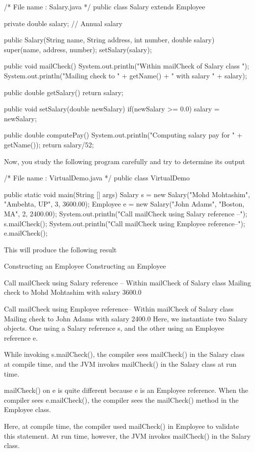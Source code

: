 /* File name : Salary.java */
public class Salary extends Employee {
   private double salary; // Annual salary

   public Salary(String name, String address, int number, double salary) {
      super(name, address, number);
      setSalary(salary);
   }

   public void mailCheck() {
      System.out.println("Within mailCheck of Salary class ");
      System.out.println("Mailing check to " + getName()
      + " with salary " + salary);
   }

   public double getSalary() {
      return salary;
   }

   public void setSalary(double newSalary) {
      if(newSalary >= 0.0) {
         salary = newSalary;
      }
   }

   public double computePay() {
      System.out.println("Computing salary pay for " + getName());
      return salary/52;
   }
}
Now, you study the following program carefully and try to determine its output

/* File name : VirtualDemo.java */
public class VirtualDemo {

   public static void main(String [] args) {
      Salary s = new Salary("Mohd Mohtashim", "Ambehta, UP", 3, 3600.00);
      Employee e = new Salary("John Adams", "Boston, MA", 2, 2400.00);
      System.out.println("Call mailCheck using Salary reference --");
      s.mailCheck();
      System.out.println("\n Call mailCheck using Employee reference--");
      e.mailCheck();
   }
}
This will produce the following result

Constructing an Employee
Constructing an Employee

Call mailCheck using Salary reference --
Within mailCheck of Salary class
Mailing check to Mohd Mohtashim with salary 3600.0

Call mailCheck using Employee reference--
Within mailCheck of Salary class
Mailing check to John Adams with salary 2400.0
Here, we instantiate two Salary objects. One using a Salary reference s, and the other using an Employee reference e.

While invoking s.mailCheck(), the compiler sees mailCheck() in the Salary class at compile time, and the JVM invokes mailCheck() in the Salary class at run time.

mailCheck() on e is quite different because e is an Employee reference. When the compiler sees e.mailCheck(), the compiler sees the mailCheck() method in the Employee class.

Here, at compile time, the compiler used mailCheck() in Employee to validate this statement. At run time, however, the JVM invokes mailCheck() in the Salary class.


